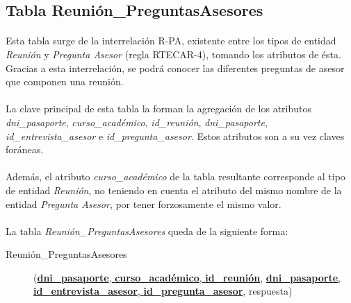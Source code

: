   \subsection{Tabla Reunión\_PreguntasAsesores}

      \paragraph{}Esta tabla surge de la interrelación R-PA, existente entre
      los tipos de entidad \textit{Reunión} y \textit{Pregunta Asesor}
      (regla RTECAR-4), tomando los atributos de ésta. Gracias a esta
      interrelación, se podrá conocer las diferentes preguntas de asesor que
      componen una reunión.

      \paragraph{}La clave principal de esta tabla la forman la agregación de
      los atributos \textit{dni\_pasaporte}, \textit{curso\_académico},
      \textit{id\_reunión}, \textit{dni\_pasaporte},
      \textit{id\_entrevista\_asesor} e \textit{id\_pregunta\_asesor}. Estos
      atributos son a su vez claves foráneas.

      \paragraph{}Además, el atributo \textit{curso\_académico} de la tabla
      resultante corresponde al tipo de entidad \textit{Reunión}, no teniendo en
      cuenta el atributo del mismo nombre de la entidad
      \textit{Pregunta Asesor}, por tener forzosamente el mismo valor.

      \paragraph{}La tabla \textit{Reunión\_PreguntasAsesores} queda de la
      siguiente forma:

      \begin{description}
         \item[Reunión\_PreguntasAsesores] \begin{flushleft}(\underline{\textbf{dni\_pasaporte}, \textbf{curso\_académico},
         \textbf{id\_reunión}}, \underline{\textbf{dni\_pasaporte},
         \textbf{id\_entrevista\_asesor}, \textbf{id\_pregunta\_asesor}},
         respuesta)\end{flushleft}
      \end{description}